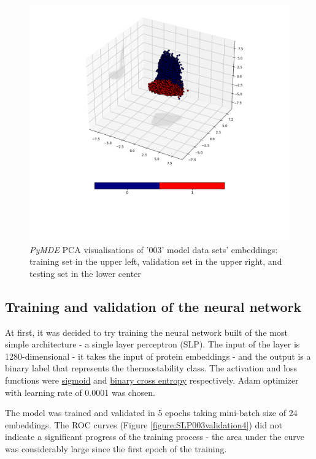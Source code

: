 \documentclass[12pt]{article}
\begin{document}
\begin{figure}[h!]
		\includegraphics[scale=0.4]{003_test_v2_MDE_PCA.png}

		\caption{\textit{PyMDE} PCA visualisations of '003' model data sets' embeddings: training set
				in the upper left, validation set in the upper right, and 
				testing set in the lower center}
		\label{figure:PyMDEPCAembeddings003}
	\end{figure}

	\newpage

	\subsection{Training and validation of the neural network}

	At first, it was decided to try training the neural network built of
	the most simple architecture - a single layer perceptron (SLP). The input of the 
	layer is 1280-dimensional - it takes the input of protein embeddings - and the 
	output is a binary label that represents the thermostability class. The 
	activation and loss functions were 
	\href{https://pytorch.org/docs/stable/generated/torch.nn.Sigmoid.html}{sigmoid} 
	and 
	\href{https://pytorch.org/docs/stable/generated/torch.nn.BCELoss.html}{binary cross entropy} 
	respectively. 
	Adam optimizer \cite{kingma2014adam} 
	with learning rate of 0.0001 was chosen.

	The model was trained and validated in 5 epochs taking mini-batch size of 24
	embeddings. The ROC curves (Figure \ref{figure:SLP003validation4}) did not 
	indicate a significant progress of the training process - the area under 
	the curve was considerably large since the
	first epoch of the training.
\end{document}

